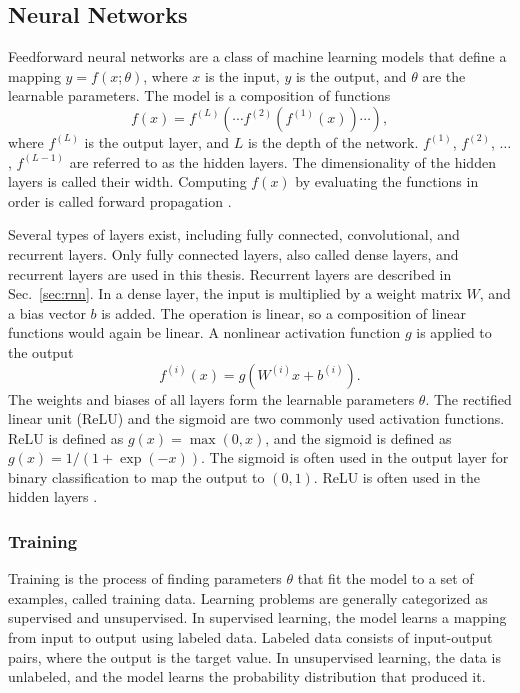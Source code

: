 \subsection{Neural Networks}\label{sec:nn}
Feedforward neural networks are a class of machine learning models that define a mapping $y=f(x;\theta)$, where $x$ is the input, $y$ is the output, and $\theta$ are the learnable parameters. The model is a composition of functions 
\begin{equation}
f(x) = f^{(L)}\!\left(\cdots f^{(2)}\!\left(f^{(1)}(x)\right)\cdots\right),
\label{eq:nn-composition}
\end{equation}
where $f^{(L)}$ is the output layer, and $L$ is the depth of the network. $f^{(1)}$, $f^{(2)}$, $\dots$, $f^{(L-1)}$ are referred to as the hidden layers. The dimensionality of the hidden layers is called their width. Computing $f(x)$ by evaluating the functions in order is called forward propagation \parencite[204]{goodfellowDeepLearning2016}.

Several types of layers exist, including fully connected, convolutional, and recurrent layers. Only fully connected layers, also called dense layers, and recurrent layers are used in this thesis. Recurrent layers are described in Sec.~\ref{sec:rnn}. In a dense layer, the input is multiplied by a weight matrix $W$, and a bias vector $b$ is added. The operation is linear, so a composition of linear functions would again be linear. A nonlinear activation function $g$ is applied to the output
\begin{equation}
f^{(i)}(x) = g\!\left(W^{(i)} x + b^{(i)}\right).
\end{equation}
The weights and biases of all layers form the learnable parameters $\theta$. The rectified linear unit (ReLU) and the sigmoid are two commonly used activation functions. ReLU is defined as $g(x) = \max(0,x)$, and the sigmoid is defined as $g(x) = 1/(1+\exp(-x))$. The sigmoid is often used in the output layer for binary classification to map the output to $(0,1)$. ReLU is often used in the hidden layers \parencite[174]{goodfellowDeepLearning2016}.

\subsubsection{Training}\label{sec:nn-training}

Training is the process of finding parameters $\theta$ that fit the model to a set of examples, called training data. Learning problems are generally categorized as supervised and unsupervised.
In supervised learning, the model learns a mapping from input to output using labeled data. Labeled data consists of input-output pairs, where the output is the target value. In unsupervised learning, the data is unlabeled, and the model learns the probability distribution that produced it.

